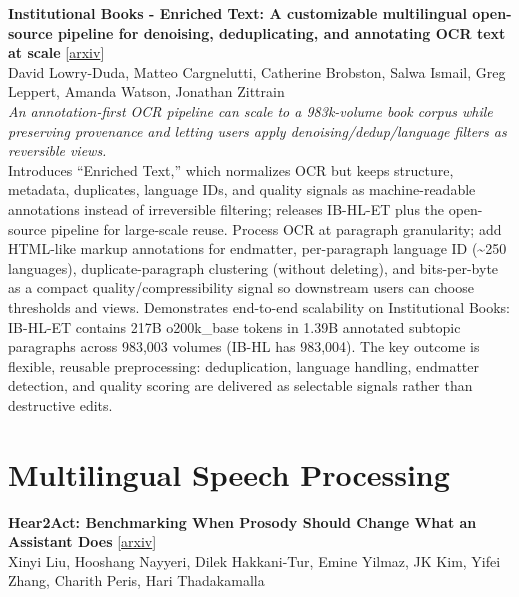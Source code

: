 \documentclass[12pt,letterpaper]{article}
\begin{document}
\medskip

{\small\textbf{Institutional Books - Enriched Text: A customizable multilingual open-source pipeline for denoising, deduplicating, and annotating OCR text at scale}} {\scriptsize[\href{https://arxiv.org/abs/2608.19026}{arxiv}]}\\
{\scriptsize David Lowry-Duda, Matteo Cargnelutti, Catherine Brobston, Salwa Ismail, Greg Leppert, Amanda Watson, Jonathan Zittrain}\\

{\small\textit{An annotation-first OCR pipeline can scale to a 983k-volume book corpus while preserving provenance and letting users apply denoising/dedup/language filters as reversible views.}}\\[1pt]
{\footnotesize Introduces ``Enriched Text,'' which normalizes OCR but keeps structure, metadata, duplicates, language IDs, and quality signals as machine-readable annotations instead of irreversible filtering; releases IB-HL-ET plus the open-source pipeline for large-scale reuse. Process OCR at paragraph granularity; add HTML-like markup annotations for endmatter, per-paragraph language ID (\textasciitilde{}250 languages), duplicate-paragraph clustering (without deleting), and bits-per-byte as a compact quality/compressibility signal so downstream users can choose thresholds and views. Demonstrates end-to-end scalability on Institutional Books: IB-HL-ET contains 217B o200k\_base tokens in 1.39B annotated subtopic paragraphs across 983,003 volumes (IB-HL has 983,004). The key outcome is flexible, reusable preprocessing: deduplication, language handling, endmatter detection, and quality scoring are delivered as selectable signals rather than destructive edits.}

\medskip


\section*{Multilingual Speech Processing}

{\small\textbf{Hear2Act: Benchmarking When Prosody Should Change What an Assistant Does}} {\scriptsize[\href{https://arxiv.org/abs/2608.19515}{arxiv}]}\\
{\scriptsize Xinyi Liu, Hooshang Nayyeri, Dilek Hakkani-Tur, Emine Yilmaz, JK Kim, Yifei Zhang, Charith Peris, Hari Thadakamalla}\\
\end{document}

